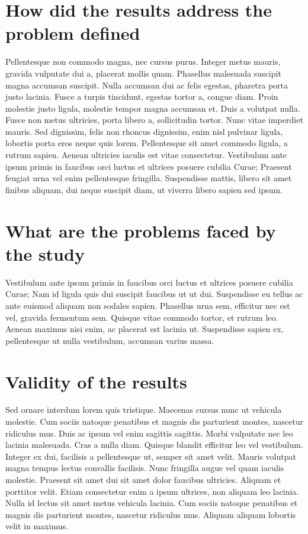 \documentclass[12pt, a4paper,twoside]{tesi_upf}
\begin{document}
\section{How did the results address the problem defined}

Pellentesque non commodo magna, nec cursus purus. Integer metus mauris, gravida vulputate dui a, placerat mollis quam. Phasellus malesuada suscipit magna accumsan suscipit. Nulla accumsan dui ac felis egestas, pharetra porta justo lacinia. Fusce a turpis tincidunt, egestas tortor a, congue diam. Proin molestie justo ligula, molestie tempor magna accumsan et. Duis a volutpat nulla. Fusce non metus ultricies, porta libero a, sollicitudin tortor. Nunc vitae imperdiet mauris. Sed dignissim, felis non rhoncus dignissim, enim nisl pulvinar ligula, lobortis porta eros neque quis lorem. Pellentesque sit amet commodo ligula, a rutrum sapien. Aenean ultricies iaculis est vitae consectetur. Vestibulum ante ipsum primis in faucibus orci luctus et ultrices posuere cubilia Curae; Praesent feugiat urna vel enim pellentesque fringilla. Suspendisse mattis, libero sit amet finibus aliquam, dui neque suscipit diam, ut viverra libero sapien sed ipsum.

\section{What are the problems faced by the study}

Vestibulum ante ipsum primis in faucibus orci luctus et ultrices posuere cubilia Curae; Nam id ligula quis dui suscipit faucibus ut ut dui. Suspendisse eu tellus ac ante euismod aliquam non sodales sapien. Phasellus urna sem, efficitur nec est vel, gravida fermentum sem. Quisque vitae commodo tortor, et rutrum leo. Aenean maximus nisi enim, ac placerat est lacinia ut. Suspendisse sapien ex, pellentesque ut nulla vestibulum, accumsan varius massa.

\section{Validity of the results}

Sed ornare interdum lorem quis tristique. Maecenas cursus nunc ut vehicula molestie. Cum sociis natoque penatibus et magnis dis parturient montes, nascetur ridiculus mus. Duis ac ipsum vel enim sagittis sagittis. Morbi vulputate nec leo lacinia malesuada. Cras a nulla diam. Quisque blandit efficitur leo vel vestibulum. Integer ex dui, facilisis a pellentesque ut, semper sit amet velit. Mauris volutpat magna tempus lectus convallis facilisis. Nunc fringilla augue vel quam iaculis molestie. Praesent sit amet dui sit amet dolor faucibus ultricies. Aliquam et porttitor velit. Etiam consectetur enim a ipsum ultrices, non aliquam leo lacinia. Nulla id lectus sit amet metus vehicula lacinia. Cum sociis natoque penatibus et magnis dis parturient montes, nascetur ridiculus mus. Aliquam aliquam lobortis velit in maximus.
\end{document}
